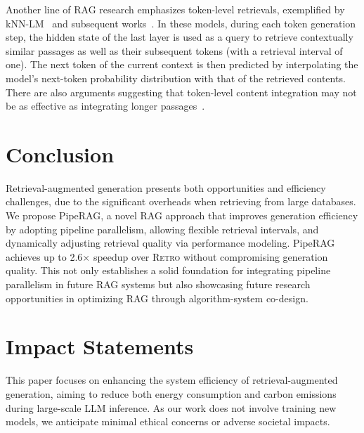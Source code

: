 Another line of RAG research emphasizes token-level retrievals, exemplified by kNN-LM~\cite{khandelwal2019generalization} and subsequent works~\cite{khandelwal2020nearest, meng2021fast, xu2023nearest}. In these models, during each token generation step, the hidden state of the last layer is used as a query to retrieve contextually similar passages as well as their subsequent tokens (with a retrieval interval of one). The next token of the current context is then predicted by interpolating the model's next-token probability distribution with that of the retrieved contents. There are also arguments suggesting that token-level content integration may not be as effective as integrating longer passages~\cite{wang2023knn}.
\section{Conclusion}
\label{sec:conclusion}

Retrieval-augmented generation presents both opportunities and efficiency challenges, due to the significant overheads when retrieving from large databases. 
We propose PipeRAG, a novel RAG approach that improves generation efficiency by adopting pipeline parallelism, allowing flexible retrieval intervals, and dynamically adjusting retrieval quality via performance modeling. PipeRAG achieves up to 2.6$\times$ speedup over \textsc{Retro} without compromising generation quality. This not only establishes a solid foundation for integrating pipeline parallelism in future RAG systems but also showcasing future research opportunities in optimizing RAG through algorithm-system co-design.

\newpage
\section*{Impact Statements}
\label{sec:impact}

This paper focuses on enhancing the system efficiency of retrieval-augmented generation, aiming to reduce both energy consumption and carbon emissions during large-scale LLM inference. As our work does not involve training new models, we anticipate minimal ethical concerns or adverse societal impacts.

\newpage


